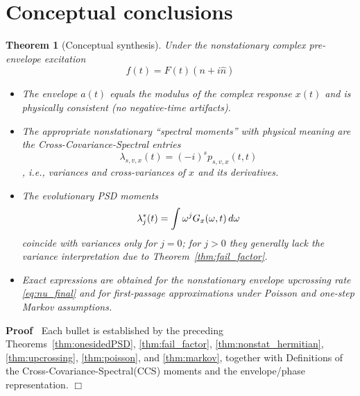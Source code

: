 \documentclass{article}
\newenvironment{proof}{\noindent\textbf{Proof\ }}{\hspace*{\fill}$\Box$\medskip}
\newtheorem{theorem}{Theorem}
\begin{document}
\section{Conceptual conclusions}

\begin{theorem}
  [Conceptual synthesis]\label{thm:conclusion} Under the nonstationary complex
  pre-envelope excitation
  \begin{equation}
    f (t) = F (t)  (n + i \hat{n})
  \end{equation}
  \begin{itemize}
    \item The envelope $a (t)$ equals the modulus of the complex response $x
    (t)$ and is physically consistent (no negative-time artifacts).
    
    \item The appropriate nonstationary ``spectral moments'' with physical
    meaning are the Cross-Covariance-Spectral entries
    \begin{equation}
      \lambda_{s, v, x} (t) = (- i)^s p_{s, v, x} (t, t)
    \end{equation}
    , i.e., variances and cross-variances of $x$ and its derivatives.
    
    \item The evolutionary PSD moments
    \begin{equation}
      \lambda_j^{\ast} (t) = \int \omega^j G_x (\omega, t)  \hspace{0.17em} d
      \omega
    \end{equation}
    coincide with variances only for $j = 0$; for $j > 0$ they generally lack
    the variance interpretation due to Theorem~\ref{thm:fail_factor}.
    
    \item Exact expressions are obtained for the nonstationary envelope
    upcrossing rate \eqref{eq:nu_final} and for first-passage approximations
    under Poisson and one-step Markov assumptions.
  \end{itemize}
\end{theorem}

\begin{proof}
  Each bullet is established by the preceding Theorems~\ref{thm:onesidedPSD},
  \ref{thm:fail_factor}, \ref{thm:nonstat_hermitian}, \ref{thm:upcrossing},
  \ref{thm:poisson}, and \ref{thm:markov}, together with Definitions of the
  Cross-Covariance-Spectral(CCS) moments and the envelope/phase
  representation.
\end{proof}
\end{document}
